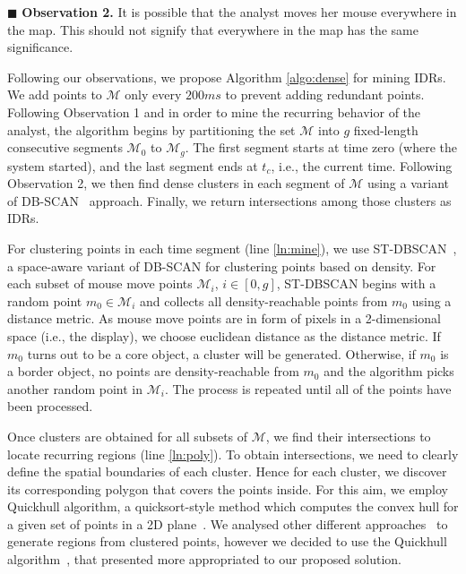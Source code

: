 \vspace{2pt}
\noindent $\blacksquare$ {\bf Observation 2.} It is possible that the analyst moves her mouse everywhere in the map. This should not signify that everywhere in the map has the same significance.

\vspace{2pt}
Following our observations, we propose Algorithm \ref{algo:dense} for mining IDRs. We add points to $\mathcal{M}$ only every $200ms$ to prevent adding redundant points.  Following Observation 1 and in order to mine the recurring behavior of the analyst, the algorithm begins by partitioning the set $\mathcal{M}$ into $g$ fixed-length consecutive segments $\mathcal{M}_0$ to $\mathcal{M}_g$. The first segment starts at time zero (where the system started), and the last segment ends at $t_c$, i.e., the current time. Following Observation 2, we then find dense clusters in each segment of $\mathcal{M}$ using a variant of DB-SCAN~\cite{Ester:1996} approach. Finally, we return intersections among those clusters as IDRs.

\vspace{2pt}
For clustering points in each time segment (line \ref{ln:mine}), we use ST-DBSCAN~\cite{Birant:2007}, a space-aware variant of DB-SCAN for clustering points based on density. For each subset of mouse move points $\mathcal{M}_i$, $i \in [0,g]$, ST-DBSCAN begins with a random point $m_0 \in \mathcal{M}_i$ and collects all density-reachable points from $m_0$ using a distance metric. As mouse move points are in form of pixels in a 2-dimensional space (i.e., the display), we choose euclidean distance as the distance metric. If $m_0$ turns out to be a core object, a cluster will be generated. Otherwise, if $m_0$ is a border object, no points are density-reachable from $m_0$ and the algorithm picks another random point in $\mathcal{M}_i$. The process is repeated until all of the points have been processed.

\vspace{2pt}
Once clusters are obtained for all subsets of $\mathcal{M}$, we find their intersections to locate recurring regions (line \ref{ln:poly}). To obtain intersections, we need to clearly define the spatial boundaries of each cluster. Hence for each cluster, we discover its corresponding polygon that covers the points inside. For this aim, we employ Quickhull algorithm, a quicksort-style method which computes the convex hull for a given set of points in a 2D plane~\cite{Barber:1996}. We analysed other different approaches~\cite{Bevis1989,DUCKHAM2008,FADILI2004,ARAMPATZIS2006,Galton2006} to generate regions from clustered points, however we decided to use the Quickhull  algorithm~\cite{Barber:1996}, that presented more appropriated to our proposed solution.

